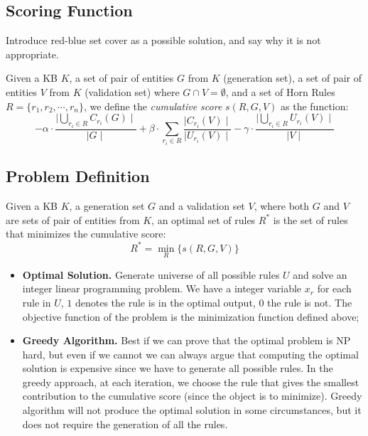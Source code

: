 \subsection{Scoring Function}

{\color{red} Introduce red-blue set cover as a possible solution, and
	say why it is not appropriate.}

Given a KB $K$, a set of pair of entities $G$ from $K$ (generation set), a set of pair of entities $V$ from $K$ (validation set) where $G \cap V = \emptyset$, and a set of Horn Rules $R=\{r_1,r_2,\cdots,r_n\}$, we define the \emph{cumulative score} $s(R,G,V)$ as the function:
\begin{equation*}
-\alpha \cdot \frac{\mid\bigcup\limits_{r_i \in R} C_{r_i}(G)\mid}{\mid G \mid} +\beta \cdot \sum_{r_i \in R}\frac{\mid C_{r_i}(V) \mid}{\mid U_{r_i}(V)\mid}  -\gamma \cdot \frac{\mid\bigcup\limits_{r_i \in R} U_{r_i}(V)\mid}{\mid V \mid}
\end{equation*}

\subsection{Problem Definition}
Given a KB $K$, a generation set $G$ and a validation set $V$, where both $G$ and $V$ are sets of pair of entities from $K$, an optimal set of rules $R^*$ is the set of rules that minimizes the cumulative score:
\begin{equation*}
R^* = \min\limits_{R}\{s(R,G,V)\}
\end{equation*}
\begin{itemize}
\item \textbf{Optimal Solution.} Generate universe of all possible rules $U$ and solve an integer linear programming problem. We have a integer variable $x_r$ for each rule in $U$, $1$ denotes the rule is in the optimal output, $0$ the rule is not. The objective function of the problem is the minimization function defined above;
\item \textbf{Greedy Algorithm.} Best if we can prove that the optimal problem is NP hard, but even if we cannot we can always argue that computing the optimal solution is expensive since we have to generate all possible rules. In the greedy approach, at each iteration, we choose the rule that gives the smallest contribution to the cumulative score (since the object is to minimize). Greedy algorithm will not produce the optimal solution in some circumstances, but it does not require the generation of all the rules.
\end{itemize}